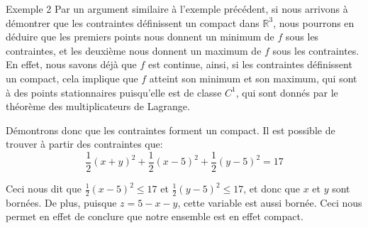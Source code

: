 \documentclass[a4paper]{article}
\begin{document}
\begin{parag}{Exemple 2}
    Par un argument similaire à l'exemple précédent, si nous arrivons à démontrer que les contraintes définissent un compact dans $\mathbb{R}^3$, nous pourrons en déduire que les premiers points nous donnent un minimum de $f$ sous les contraintes, et les deuxième nous donnent un maximum de $f$ sous les contraintes. En effet, nous savons déjà que $f$ est continue, ainsi, si les contraintes définissent un compact, cela implique que $f$ atteint son minimum et son maximum, qui sont à des points stationnaires puisqu'elle est de classe $C^1$, qui sont donnés par le théorème des multiplicateurs de Lagrange.

    Démontrons donc que les contraintes forment un compact. Il est possible de trouver à partir des contraintes que: 
    \[\frac{1}{2}\left(x + y\right)^2 + \frac{1}{2}\left(x - 5\right)^2 + \frac{1}{2}\left(y - 5\right)^2 = 17\]
    
    Ceci nous dit que $\frac{1}{2} \left(x - 5\right)^2 \leq 17$ et $\frac{1}{2}\left(y - 5\right)^2 \leq 17$, et donc que $x$ et $y$ sont bornées. De plus, puisque $z = 5 - x- y$, cette variable est aussi bornée. Ceci nous permet en effet de conclure que notre ensemble est en effet compact.
\end{parag}
\end{document}
